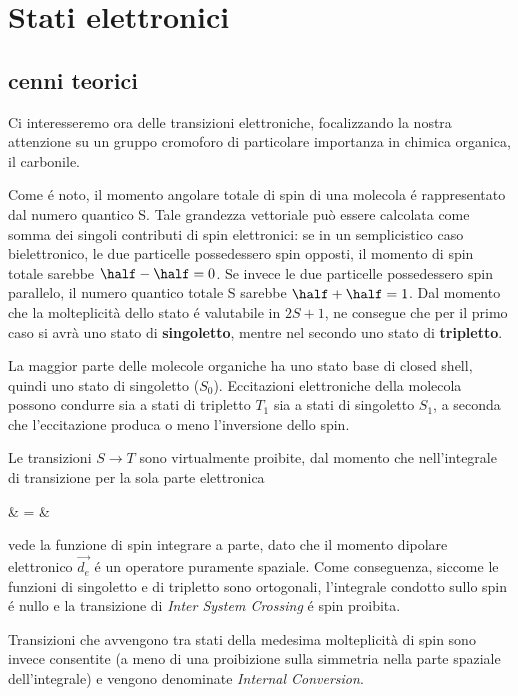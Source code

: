 \section{Stati elettronici}
\subsection{cenni teorici}


Ci interesseremo ora delle transizioni elettroniche, focalizzando la nostra attenzione
su un gruppo cromoforo di particolare importanza in chimica organica, il carbonile.

Come \'e noto, il momento angolare totale di spin di una molecola \'e
rappresentato dal numero quantico S. Tale grandezza vettoriale pu\`o essere 
calcolata come somma dei singoli contributi di spin elettronici: se in un 
semplicistico caso bielettronico, le due particelle possedessero spin opposti,
il momento di spin totale sarebbe $ \half - \half = 0 $. Se invece le due 
particelle possedessero spin parallelo, il numero quantico totale S sarebbe 
$ \half + \half = 1 $. Dal momento che la molteplicit\`a dello stato \'e 
valutabile in $ 2 S + 1 $, ne consegue che per il primo caso si avr\`a uno
stato di \textbf{singoletto}, mentre nel secondo uno stato di \textbf{tripletto}.

La maggior parte delle molecole organiche ha uno stato base di
closed shell, quindi uno stato di singoletto ($S_{0}$). Eccitazioni elettroniche
della molecola possono condurre sia a stati di tripletto $T_{1}$ sia a stati di
singoletto $S_{1}$, a seconda che l'eccitazione produca o meno l'inversione
dello spin.

Le transizioni $ S \rightarrow T $ sono virtualmente proibite, dal
momento che nell'integrale di transizione per la sola parte elettronica

\beqas
{} & = &
\eeqas

vede la funzione di spin integrare a parte, dato che il momento
dipolare elettronico $\overrightarrow{d_{e}}$ \'e un operatore 
puramente spaziale. 
Come conseguenza, siccome le funzioni di singoletto e di tripletto
sono ortogonali, l'integrale condotto sullo spin \'e nullo e la
transizione di \textit{Inter System Crossing} \'e spin proibita.

Transizioni che avvengono tra stati della medesima molteplicit\`a di spin
sono invece consentite (a meno di una proibizione sulla simmetria nella
parte spaziale dell'integrale) e vengono denominate \textit{Internal
Conversion}.

